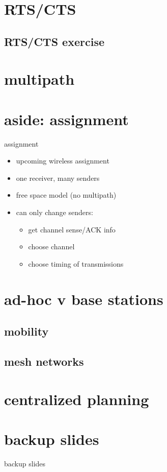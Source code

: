 \section{RTS/CTS}


\subsection{RTS/CTS exercise}


\section{multipath}



\section{aside: assignment}
\begin{frame}{assignment}
    \begin{itemize}
    \item upcoming wireless assignment
    \item one receiver, many senders
    \item free space model (no multipath)
    \item can only change senders:
        \begin{itemize}
        \item get channel sense/ACK info
        \item choose channel
        \item choose timing of transmissions
        \end{itemize}
    \end{itemize}
\end{frame}

\section{ad-hoc v base stations}


\subsection{mobility}


\subsection{mesh networks}


\section{centralized planning}




\section{backup slides}
\begin{frame}{backup slides}
\end{frame}


